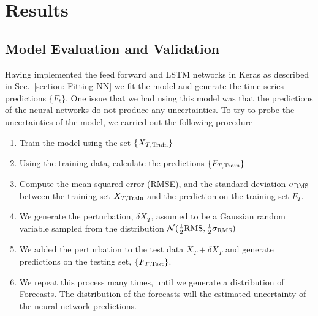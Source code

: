 \documentclass[10pt,a4paper]{article}
\begin{document}
\section{Results}
%
\subsection{Model Evaluation and Validation}
%
Having implemented the feed forward and LSTM networks in Keras as described in Sec.~\ref{section: Fitting NN} we fit the model and generate the time series predictions $\lbrace F_t \rbrace$. One issue that we had using this model was that the predictions of the neural networks do not produce any uncertainties. To try to probe the uncertainties of the model, we carried out the following procedure \\
\begin{enumerate}
\item Train the model using the set $\lbrace X_{T,{\rm Train}} \rbrace$
\item Using the training data, calculate the predictions $\lbrace F_{T,{\rm Train}} \rbrace$
\item Compute the mean squared error (RMSE), and the standard deviation $\sigma_{\rm RMS}$ between the training set $X_{T,{\rm Train}}$ and the prediction on the training set $F_T$.
\item We generate the perturbation, $\delta X_{T}$, assumed to be a Gaussian random variable sampled from the distribution $ \mathcal{N}(\frac{1}{2}{\rm RMS},\frac{1}{2}\sigma_{\rm RMS} )$
\item We added the perturbation to the test data $X_T +\delta X_{T}$ and generate predictions on the testing set, $\lbrace F_{T,{\rm Test}} \rbrace$.
\item We repeat this process many times, until we generate a distribution of Forecasts. The distribution of the forecasts will the estimated uncertainty of the neural network predictions.
\end{enumerate}
\end{document}
